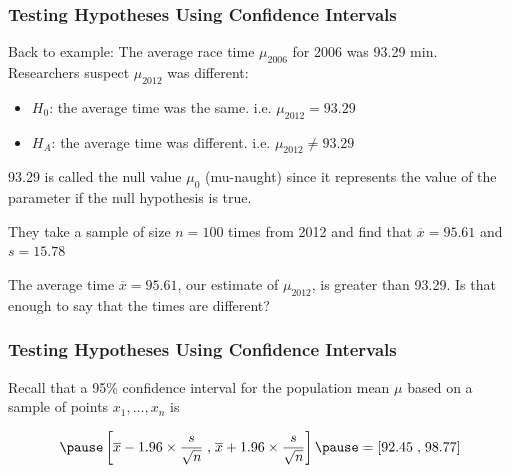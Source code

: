 \documentclass[handout]{beamer}
\newcommand{\blue}[1]{\textcolor{blue2}{#1}}
\newcommand{\xbar}{\overline{x}}
\begin{document}
\begin{frame}
\frametitle{Testing Hypotheses Using Confidence Intervals}

Back to example:  The average race time $\mu_{2006}$ for 2006 was 93.29 min.  Researchers suspect $\mu_{2012}$ was different:
\begin{itemize}
\pause \item $H_0$: the average time was the same. i.e. $\mu_{2012} = 93.29$
\pause \item $H_A$: the average time was different. i.e. $\mu_{2012} \neq 93.29$
\end{itemize}

\pause \vspace{0.5cm}

93.29 is called the \blue{null value $\mu_{0}$} (mu-naught) since it represents the value of the parameter if the null hypothesis is true.

\pause \vspace{0.5cm}

They take a sample of size $n=100$ times from 2012 and find that $\xbar=95.61$ and $s=15.78$

\pause \vspace{0.5cm}

The average time $\xbar=95.61$, our estimate of $\mu_{2012}$, is greater than 93.29.  Is that enough to say that the times are different?

\end{frame}



\begin{frame}
\frametitle{Testing Hypotheses Using Confidence Intervals}

Recall that a 95\% confidence interval for the population mean $\mu$ based on a sample of points $x_1, \ldots, x_n$ is 

\begin{eqnarray*}
\pause \left[\overline{x} - 1.96 \times\frac{s}{\sqrt n}\right.,
\left.\overline{x} + 1.96 \times\frac{s}{\sqrt n}\right]
\pause = \left[92.45\right., \left.98.77\right]
\end{eqnarray*}


\end{frame}
\end{document}
